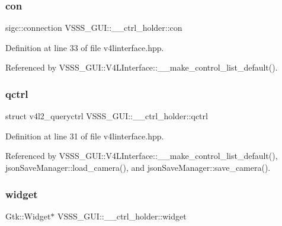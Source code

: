 \subsubsection{\texorpdfstring{con}{con}}
{\footnotesize\ttfamily sigc\+::connection V\+S\+S\+S\+\_\+\+G\+U\+I\+::\+\_\+\+\_\+ctrl\+\_\+holder\+::con}



Definition at line 33 of file v4linterface.\+hpp.



Referenced by V\+S\+S\+S\+\_\+\+G\+U\+I\+::\+V4\+L\+Interface\+::\+\_\+\+\_\+make\+\_\+control\+\_\+list\+\_\+default().

\mbox{\label{struct_v_s_s_s___g_u_i_1_1____ctrl__holder_ab215a49cfe0350894f78df2243fd0148}} 
\subsubsection{\texorpdfstring{qctrl}{qctrl}}
{\footnotesize\ttfamily struct v4l2\+\_\+queryctrl V\+S\+S\+S\+\_\+\+G\+U\+I\+::\+\_\+\+\_\+ctrl\+\_\+holder\+::qctrl}



Definition at line 31 of file v4linterface.\+hpp.



Referenced by V\+S\+S\+S\+\_\+\+G\+U\+I\+::\+V4\+L\+Interface\+::\+\_\+\+\_\+make\+\_\+control\+\_\+list\+\_\+default(), json\+Save\+Manager\+::load\+\_\+camera(), and json\+Save\+Manager\+::save\+\_\+camera().

\mbox{\label{struct_v_s_s_s___g_u_i_1_1____ctrl__holder_a520db763fb25758f6f39e833a4e99c4b}} 
\subsubsection{\texorpdfstring{widget}{widget}}
{\footnotesize\ttfamily Gtk\+::\+Widget$\ast$ V\+S\+S\+S\+\_\+\+G\+U\+I\+::\+\_\+\+\_\+ctrl\+\_\+holder\+::widget}



